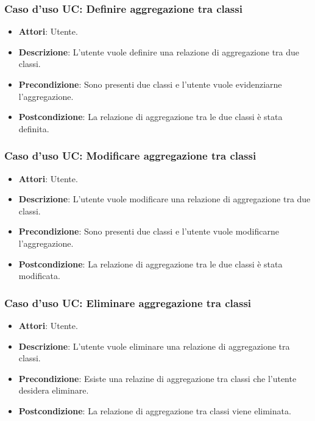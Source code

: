 \documentclass[../AnalisiDeiRequisiti.tex]{subfiles}
\begin{document}
		\subsubsection{Caso d'uso UC: Definire aggregazione tra classi}
		\begin{itemize}
			\item\textbf{Attori}: Utente.
			\item\textbf{Descrizione}: L'utente vuole definire una relazione di aggregazione tra due classi.
			\item\textbf{Precondizione}: Sono presenti due classi e l'utente vuole evidenziarne l'aggregazione.
			\item\textbf{Postcondizione}: La relazione di aggregazione tra le due classi è stata definita.
		\end{itemize}
		
		\subsubsection{Caso d'uso UC: Modificare aggregazione tra classi}
		\begin{itemize}
			\item\textbf{Attori}: Utente.
			\item\textbf{Descrizione}: L'utente vuole modificare una relazione di aggregazione tra due classi.
			\item\textbf{Precondizione}: Sono presenti due classi e l'utente vuole modificarne l'aggregazione.
			\item\textbf{Postcondizione}: La relazione di aggregazione tra le due classi è stata modificata.
		\end{itemize}
		
		\subsubsection{Caso d'uso UC: Eliminare aggregazione tra classi}
		\begin{itemize}
			\item\textbf{Attori}: Utente.
			\item\textbf{Descrizione}: L'utente vuole eliminare una relazione di aggregazione tra classi.
			\item\textbf{Precondizione}: Esiste una relazine di aggregazione tra classi che l'utente desidera eliminare.
			\item\textbf{Postcondizione}: La relazione di aggregazione tra classi viene eliminata.
		\end{itemize}
		
\end{document}
